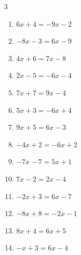 \begin{multicols}{3}
\begin{enumerate}
  \item $6x+4=-9x-2$


  \item $-8x-3=6x-9$


  \item $4x+6=7x-8$


  \item $2x-5=-6x-4$


  \item $7x+7=9x-4$


  \item $5x+3=-6x+4$


\columnbreak %

  \item $9x+5=6x-3$


  \item $-4x+2=-6x+2$

        \phantom{$\displaystyle x=0$}

  \item $-7x-7=5x+1$


  \item $7x-2=2x-4$


  \item $-2x+3=6x-7$


  \item $-8x+8=-2x-1$


  \item $8x+4=6x+5$


  \item $-x+3=6x-4$


\end{enumerate}
\end{multicols}
